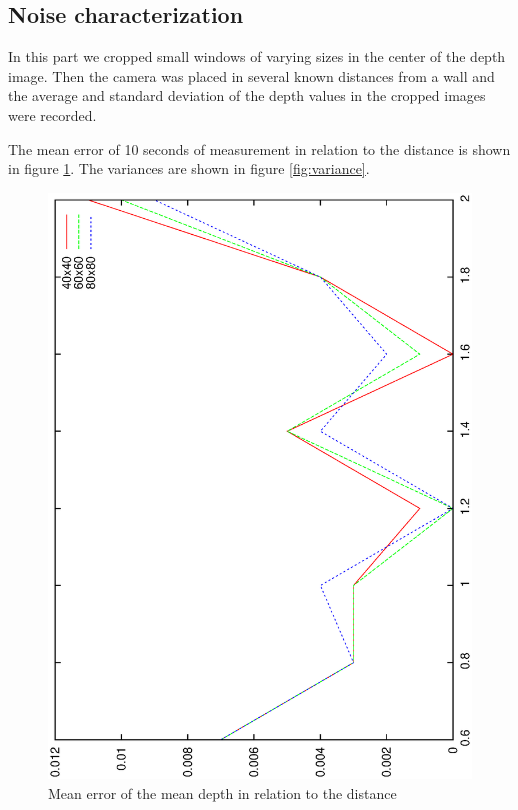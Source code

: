 \documentclass[DIV12,a4paper]{scrartcl}
\begin{document}
\subsection{Noise characterization}
\label{sec:noise_characterization}
In this part we cropped small windows of varying sizes in the center of the depth image. Then the camera was placed in several known distances from a wall and the average and standard deviation of the depth values in the cropped images were recorded.\par
The mean error of 10 seconds of measurement in relation to the distance is shown in figure \ref{fig:mean_error}. The variances are shown in figure \ref{fig:variance}.\par
\begin{figure}[!htbp]
  \centering
  \includegraphics[height=0.8\textwidth,angle=270]{figures/distance_values.eps}
  \caption{Mean error of the mean depth in relation to the distance}
  \label{fig:mean_error}
\end{figure}
\end{document}
